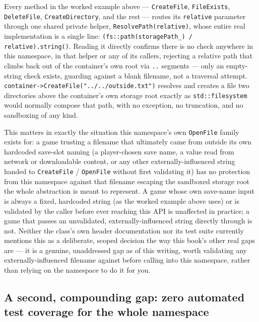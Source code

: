 Every method in the worked example above --- \texttt{CreateFile}, \texttt{FileExists},
\texttt{DeleteFile}, \texttt{CreateDirectory}, and the rest --- routes its \texttt{relative}
parameter through one shared private helper, \texttt{ResolvePath(relative)}, whose entire real
implementation is a single line: \texttt{(fs::path(storagePath\_) / relative).string()}. Reading
it directly confirms there is no check anywhere in this namespace, in that helper or any of its
callers, rejecting a relative path that climbs back out of the container's own root via
\texttt{..} segments --- only an empty-string check exists, guarding against a blank filename,
not a traversal attempt. \texttt{container->CreateFile("../../outside.txt")} resolves and
creates a file two directories above the container's own storage root exactly as
\texttt{std::filesystem} would normally compose that path, with no exception, no truncation, and
no sandboxing of any kind.

This matters in exactly the situation this namespace's own \texttt{OpenFile} family exists for:
a game trusting a filename that ultimately came from outside its own hardcoded save-slot
naming (a player-chosen save name, a value read from network or downloadable content, or any
other externally-influenced string handed to \texttt{CreateFile} / \texttt{OpenFile} without
first validating it) has no protection from this namespace against that filename escaping the
sandboxed storage root the whole  abstraction is meant to represent.
A game whose own save-name input is always a fixed, hardcoded string (as the worked example
above uses) or is validated by the caller before ever reaching this API is unaffected in
practice; a game that passes an unvalidated, externally-influenced string directly through is
not. Neither the class's own header documentation nor its test suite currently mentions this
as a deliberate, scoped decision the way this book's other real gaps are --- it is a genuine,
unaddressed gap as of this writing, worth validating any externally-influenced filename against
before calling into this namespace, rather than relying on the namespace to do it for you.

\subsection{A second, compounding gap: zero automated test coverage for the whole namespace}

